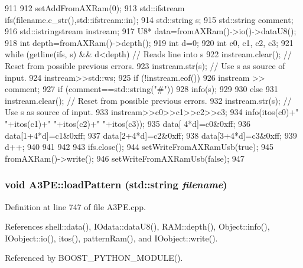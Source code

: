 \begin{DoxyCode}
911                                        {
912   setAddFromAXRam(0);
913   std::ifstream ifs(filename.c_str(),std::ifstream::in);
914   std::string s;
915   std::string comment;
916   std::istringstream instream;
917   U8* data=fromAXRam()->io()->dataU8();
918   int depth=fromAXRam()->depth();
919   int d=0;
920   int c0, c1, c2, c3;
921   while (getline(ifs, s) && d<depth) { // Reads line into s
922       instream.clear();     // Reset from possible previous errors.
923       instream.str(s);      // Use s as source of input.
924       instream>>std::ws;
925       if (!instream.eof()) {
926         instream >> comment;
927         if (comment==std::string("#")) {
928           info(s);
929         }
930         else {
931           instream.clear();     // Reset from possible previous errors.
932           instream.str(s);      // Use s as source of input.
933           instream>>c0>>c1>>c2>>c3;
934           info(itos(c0)+" "+itos(c1)+" "+itos(c2)+" "+itos(c3));
935           data[  4*d]=c0&0xff;
936           data[1+4*d]=c1&0xff;
937           data[2+4*d]=c2&0xff;
938           data[3+4*d]=c3&0xff;
939           d++;
940         }
941       }
942   }
943   ifs.close();
944   setWriteFromAXRamUsb(true);
945   fromAXRam()->write();
946   setWriteFromAXRamUsb(false);
947 }
\end{DoxyCode}
\hypertarget{classA3PE_a522cba0a4d976eec59222504af188fb2}{
\subsubsection[{loadPattern}]{\setlength{\rightskip}{0pt plus 5cm}void A3PE::loadPattern (std::string {\em filename})}}
\label{classA3PE_a522cba0a4d976eec59222504af188fb2}


Definition at line 747 of file A3PE.cpp.

References shell::data(), IOdata::dataU8(), RAM::depth(), Object::info(), IOobject::io(), itos(), patternRam(), and IOobject::write().

Referenced by BOOST\_\-PYTHON\_\-MODULE().


